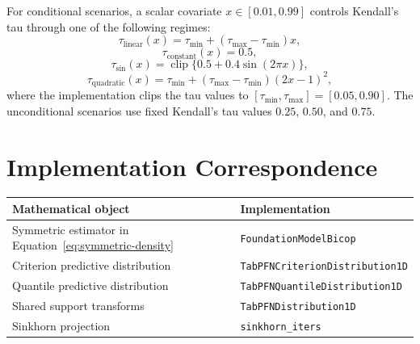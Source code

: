 \documentclass[11pt]{article}
\begin{document}
For conditional scenarios, a scalar covariate $x \in [0.01,0.99]$
controls Kendall's tau through one of the following regimes:
\[
  \tau_{\mathrm{linear}}(x)
  =
  \tau_{\min}+(\tau_{\max}-\tau_{\min})x,
\]
\[
  \tau_{\mathrm{constant}}(x)=0.5,
\]
\[
  \tau_{\mathrm{sin}}(x)
  =
  \operatorname{clip}\{0.5+0.4\sin(2\pi x)\},
\]
\[
  \tau_{\mathrm{quadratic}}(x)
  =
  \tau_{\min}+(\tau_{\max}-\tau_{\min})(2x-1)^2,
\]
where the implementation clips the tau values to
$[\tau_{\min},\tau_{\max}]=[0.05,0.90]$. The unconditional scenarios use
fixed Kendall's tau values $0.25$, $0.50$, and $0.75$.

\section{Implementation Correspondence}

\begin{table}[h]
  \centering
  \begin{tabular}{ll}
    \toprule
    Mathematical object & Implementation \\
    \midrule
    Symmetric estimator in Equation~\eqref{eq:symmetric-density}
      & \texttt{FoundationModelBicop} \\
    Criterion predictive distribution
      & \texttt{TabPFNCriterionDistribution1D} \\
    Quantile predictive distribution
      & \texttt{TabPFNQuantileDistribution1D} \\
    Shared support transforms
      & \texttt{TabPFNDistribution1D} \\
    Sinkhorn projection
      & \texttt{sinkhorn\_iters} \\
    \bottomrule
  \end{tabular}
\end{table}
\end{document}
